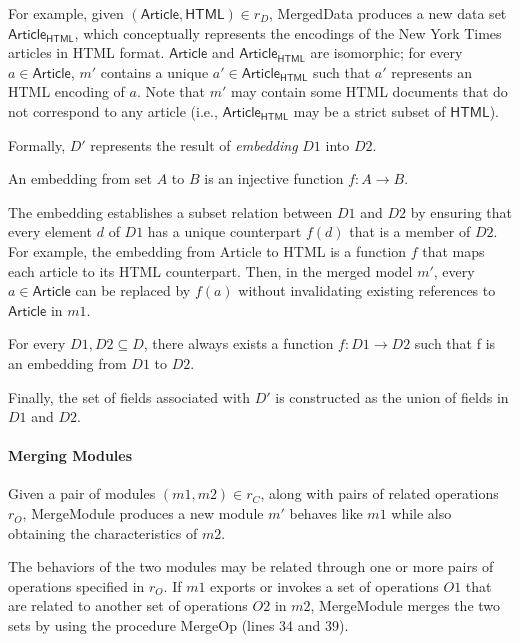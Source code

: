 For example, given $(\textsf{Article}, \textsf{HTML}) \in r_{D}$,
\textsf{MergedData} produces a new data set
$\textsf{Article}_{\textsf{HTML}}$, which conceptually represents the
encodings of the New York Times articles in HTML
format. $\textsf{Article}$ and $\textsf{Article}_{\textsf{HTML}}$ are
isomorphic; for every $a \in \textsf{Article}$, $m'$ contains a unique
$a' \in \textsf{Article}_{\textsf{HTML}}$ such that $a'$ represents an
HTML encoding of $a$. Note that $m'$ may contain some HTML documents
that do not correspond to any article (i.e.,
$\textsf{Article}_{\textsf{HTML}}$ may be a strict subset of $\textsf{HTML}$).

Formally, $D'$ represents the result of \textit{embedding} $D1$ into
$D2$.
\begin{defn} An embedding from set $A$ to $B$ is an injective function
  $f : A \rightarrow B$.
\end{defn}
The embedding establishes a subset relation between $D1$ and $D2$ by
ensuring that every element $d$ of $D1$ has a unique counterpart
$f(d)$ that is a member of $D2$. For example, the embedding from
\textsf{Article} to \textsf{HTML} is a function $f$ that maps each
article to its HTML counterpart. Then, in the merged model $m'$, every
$a \in \textsf{Article}$ can be replaced by $f(a)$ without
invalidating existing references to $\textsf{Article}$ in $m1$.

\begin{thm} For every $D1, D2 \subseteq D$, there always exists a
  function $f : D1 \rightarrow D2$ such that f is an embedding from
  $D1$ to $D2$.
\end{thm}

Finally, the set of fields associated with $D'$ is constructed as the
union of fields in $D1$ and $D2$. 

\paragraph{\textbf{Merging Modules}} Given a pair of modules $(m1, m2)
\in r_{C}$, along with pairs of related operations $r_{O}$,
\textsf{MergeModule} produces a new module $m'$ behaves like $m1$
while also obtaining the characteristics of $m2$.

The behaviors of the two modules may be related through one or more
pairs of operations specified in $r_{O}$. If $m1$ exports or invokes
a set of operations $O1$ that are related to another set of operations
$O2$ in $m2$, \textsf{MergeModule} merges the two sets by using the
procedure \textsf{MergeOp} (lines 34 and 39). 

